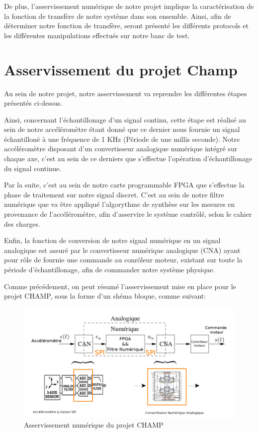 \documentclass[french,a4paper,12pt]{report}
\begin{document}
	De plus, l'asservissement numérique de notre projet implique la caractérisation de la fonction de transfère de notre système dans son ensemble.
	Ainsi, afin de déterminer notre fonction de transfère, seront présenté les différents protocols et les différentes manipulations effectués sur notre banc de test.

	\section{Asservissement du projet Champ}
	
		Au sein de notre projet, notre asservissement va reprendre les différentes étapes présentés ci-dessus.
		
		Ainsi, concernant l'échantillonage d'un signal continu, cette étape est réalisé au sein de notre accéléromètre étant
		donné que ce dernier nous fournie un signal échantilloné à une fréquence de 1 KHz (Période de une millis seconde).
		Notre accéléromètre disposant d'un convertisseur analogique numérique intégré sur chaque axe, c'est au sein de ce
		derniers que s'effectue l'opération d'échantillonage du signal continue.
		
		Par la suite, c'est au sein de notre carte programmable FPGA que s'effectue la phase de traitement sur notre signal
		discret. C'est au sein de notre filtre numérique que va être appliqué l'algorythme de synthèse sur les mesures en
		provenance de l'accéléromètre, afin d'asservire le système contrôlé, selon le cahier des charges.
		
		Enfin, la fonction de conversion de notre signal numérique en un signal analogique est assuré par le convertisseur
		numérique analogique (CNA) ayant pour rôle de fournie une commande au conrôleur moteur, existant sur toute la période
		d'échantillonage, afin de commander notre système physique.
		
		Comme précédement, on peut résumé l'asservissement mise en place pour le projet CHAMP, sous la forme d'un shéma bloque, comme suivant:
		
	\begin{figure}[!ht]
    \center
  	\includegraphics[width=17cm]{Assert_2.png}
    \caption{Asservissement numérique du projet CHAMP}
	\end{figure}	
		
\end{document}
